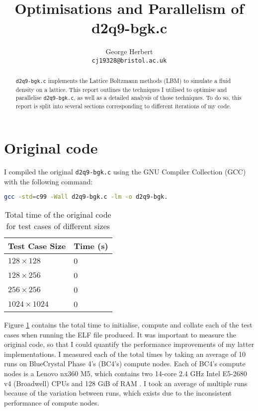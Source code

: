 \documentclass[11pt, twocolumn, a4paper]{article}
\author{
    George Herbert\\
    \texttt{cj19328@bristol.ac.uk}
}
\title{Optimisations and Parallelism of d2q9-bgk.c}
\begin{document}
\maketitle

\begin{abstract}
    \texttt{d2q9-bgk.c} implements the Lattice Boltzmann methods (LBM) to simulate a fluid density on a lattice.
    This report outlines the techniques I utilised to optimise and parallelise \texttt{d2q9-bgk.c}, as well as a detailed analysis of those techniques.
    To do so, this report is split into several sections corresponding to different iterations of my code.
\end{abstract}

\section{Original code}

I compiled the original \texttt{d2q9-bgk.c} using the GNU Compiler Collection (GCC) with the following command:
\begin{lstlisting}[language=bash, breaklines=true]
gcc -std=c99 -Wall d2q9-bgk.c -lm -o d2q9-bgk.
\end{lstlisting}

\begin{table}[htbp]
    \begin{center}
    \caption{Total time of the original code for test cases of different sizes}\label{tab:original}
    \begin{tabular}{l | l} 
        \hline\hline
        Test Case Size&Time (s)\\
        \hline
        $128 \times 128$&0\\
        $128 \times 256$&0\\
        $256 \times 256$&0\\
        $1024 \times 1024$&0\\
        \hline
      \end{tabular}
    \end{center}
\end{table} 


Figure \ref{tab:original} contains the total time to initialise, compute and collate each of the test cases when running the ELF file produced.
It was important to measure the original code, so that I could quantify the performance improvements of my latter implementations.
I measured each of the total times by taking an average of 10 runs on BlueCrystal Phase 4's (BC4's) compute nodes.
Each of BC4's compute nodes is a Lenovo nx360 M5, which contains two 14-core 2.4 GHz Intel E5-2680 v4 (Broadwell) CPUs and 128 GiB of RAM \cite{bcp4}.
I took an average of multiple runs because of the variation between runs, which exists due to the inconsistent performance of compute nodes.
\end{document}
